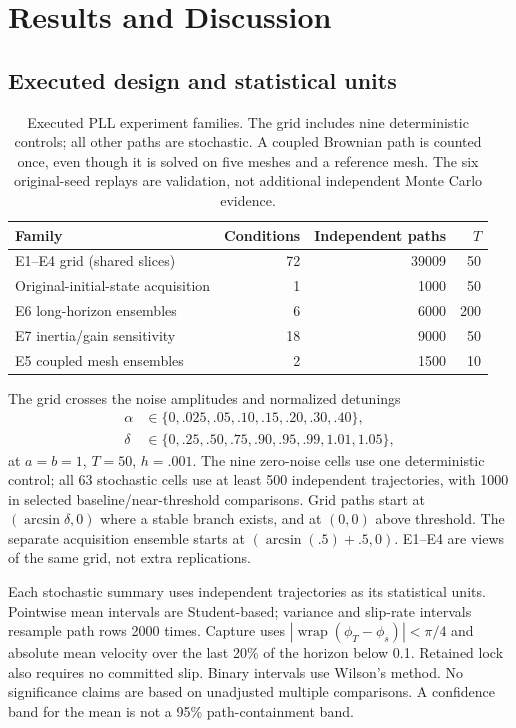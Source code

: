 \documentclass[11pt,a4paper]{article}
\begin{document}
\section{Results and Discussion}
\subsection{Executed design and statistical units}
\begin{table}[htbp]\centering\small
\setlength{\tabcolsep}{4pt}
\begin{tabular}{lrrr}\toprule
Family & Conditions & Independent paths & $T$ \\ \midrule
E1--E4 grid (shared slices) & 72 & 39009 & 50 \\
Original-initial-state acquisition & 1 & 1000 & 50 \\
E6 long-horizon ensembles & 6 & 6000 & 200 \\
E7 inertia/gain sensitivity & 18 & 9000 & 50 \\
E5 coupled mesh ensembles & 2 & 1500 & 10 \\
\bottomrule\end{tabular}
\caption{Executed PLL experiment families. The grid includes nine deterministic controls; all other paths are stochastic. A coupled Brownian path is counted once, even though it is solved on five meshes and a reference mesh. The six original-seed replays are validation, not additional independent Monte Carlo evidence.}
\label{tab:counts}
\end{table}
The grid crosses the noise amplitudes and normalized detunings\[\begin{aligned}\alpha&\in\{0,.025,.05,.10,.15,.20,.30,.40\},\\\delta&\in\{0,.25,.50,.75,.90,.95,.99,1.01,1.05\},\end{aligned}\]at $a=b=1$, $T=50$, $h=.001$. The nine zero-noise cells use one deterministic control; all 63 stochastic cells use at least 500 independent trajectories, with 1000 in selected baseline/near-threshold comparisons. Grid paths start at $(\arcsin\delta,0)$ where a stable branch exists, and at $(0,0)$ above threshold. The separate acquisition ensemble starts at $(\arcsin(.5)+.5,0)$. E1--E4 are views of the same grid, not extra replications.

Each stochastic summary uses independent trajectories as its statistical units. Pointwise mean intervals are Student-based; variance and slip-rate intervals resample path rows 2000 times. Capture uses $|\operatorname{wrap}(\phi_T-\phi_s)|<\pi/4$ and absolute mean velocity over the last 20\% of the horizon below 0.1. Retained lock also requires no committed slip. Binary intervals use Wilson's method. No significance claims are based on unadjusted multiple comparisons. A confidence band for the mean is not a 95\% path-containment band.
\end{document}
